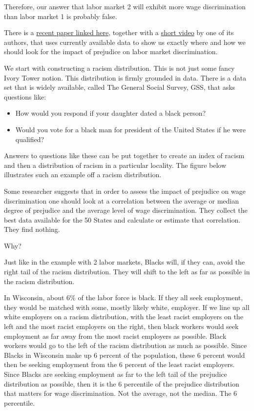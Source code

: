\documentclass[
]{book}
\providecommand{\tightlist}{%
  \setlength{\itemsep}{0pt}\setlength{\parskip}{0pt}}
\begin{document}
Therefore, our answer that labor market 2 will exhibit more wage discrimination than labor market 1 is probably false.

There is a \href{https://papers.ssrn.com/sol3/papers.cfm?abstract_id=1073644}{recent paper linked here}, together with a \href{https://www.youtube.com/watch?v=N38XrQ6x7ck}{short video} by one of its authors, that uses currently available data to show us exactly where and how we should look for the impact of prejudice on labor market discrimination.

We start with constructing a racism distribution. This is not just some fancy Ivory Tower notion. This distribution is firmly grounded in data. There is a data set that is widely available, called The General Social Survey, GSS, that asks questions like:

\begin{itemize}
\tightlist
\item
  How would you respond if your daughter dated a black person?
\item
  Would you vote for a black man for president of the United States if he were qualified?
\end{itemize}

Answers to questions like these can be put together to create an index of racism and then a distribution of racism in a particular locality. The figure below illustrates such an example off a racism distribution.

Some researcher suggests that in order to assess the impact of prejudice on wage discrimination one should look at a correlation between the average or median degree of prejudice and the average level of wage discrimination. They collect the best data available for the 50 States and calculate or estimate that correlation. They find nothing.

Why?

Just like in the example with 2 labor markets, Blacks will, if they can, avoid the right tail of the racism distribution. They will shift to the left as far as possible in the racism distribution.

In Wisconsin, about 6\% of the labor force is black. If they all seek employment, they would be matched with some, mostly likely white, employer. If we line up all white employers on a racism distribution, with the least racist employers on the left and the most racist employers on the right, then black workers would seek employment as far away from the most racist employers as possible. Black workers would go to the left of the racism distribution as much as possible. Since Blacks in Wisconsin make up 6 percent of the population, these 6 percent would then be seeking employment from the 6 percent of the least racist employers. Since Blacks are seeking employment as far to the left tail of the prejudice distribution as possible, then it is the 6 percentile of the prejudice distribution that matters for wage discrimination. Not the average, not the median. The 6 percentile.
\end{document}

